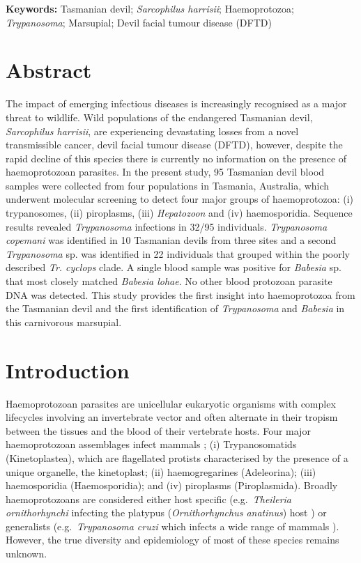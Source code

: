 \documentclass[a4paper, nobind]{templates/ociamthesis}
\begin{document}
\vspace{5mm}

\textbf{Keywords:} Tasmanian devil; \emph{Sarcophilus harrisii}; Haemoprotozoa; \emph{Trypanosoma}; Marsupial; Devil facial tumour disease (DFTD)

\newpage

\hypertarget{abstract-4}{%
\section{Abstract}\label{abstract-4}}

The impact of emerging infectious diseases is increasingly recognised as a major threat to wildlife. Wild populations of the endangered Tasmanian devil, \emph{Sarcophilus harrisii}, are experiencing devastating losses from a novel transmissible cancer, devil facial tumour disease (DFTD), however, despite the rapid decline of this species there is currently no information on the presence of haemoprotozoan parasites. In the present study, 95 Tasmanian devil blood samples were collected from four populations in Tasmania, Australia, which underwent molecular screening to detect four major groups of haemoprotozoa: (i) trypanosomes, (ii) piroplasms, (iii) \emph{Hepatozoon} and (iv) haemosporidia. Sequence results revealed \emph{Trypanosoma} infections in 32/95 individuals. \emph{Trypanosoma copemani} was identified in 10 Tasmanian devils from three sites and a second \emph{Trypanosoma} sp. was identified in 22 individuals that grouped within the poorly described \emph{Tr. cyclops} clade. A single blood sample was positive for \emph{Babesia} sp. that most closely matched \emph{Babesia lohae}. No other blood protozoan parasite DNA was detected. This study provides the first insight into haemoprotozoa from the Tasmanian devil and the first identification of \emph{Trypanosoma} and \emph{Babesia} in this carnivorous marsupial.

\hypertarget{introduction-4}{%
\section{Introduction}\label{introduction-4}}

Haemoprotozoan parasites are unicellular eukaryotic organisms with complex lifecycles involving an invertebrate vector and often alternate in their tropism between the tissues and the blood of their vertebrate hosts. Four major haemoprotozoan assemblages infect mammals \autocite{odonoghueHaemoprotozoaMakingBiological2017}; (i) Trypanosomatids (Kinetoplastea), which are flagellated protists characterised by the presence of a unique organelle, the kinetoplast; (ii) haemogregarines (Adeleorina); (iii) haemosporidia (Haemosporidia); and (iv) piroplasms (Piroplasmida). Broadly haemoprotozoans are considered either host specific (e.g.~\emph{Theileria ornithorhynchi} infecting the platypus (\emph{Ornithorhynchus anatinus}) host \autocite{papariniFirstMolecularCharacterization2015}) or generalists (e.g.~\emph{Trypanosoma cruzi} which infects a wide range of mammals \autocite{clementOutAfricaOrigins2020}). However, the true diversity and epidemiology of most of these species remains unknown.
\end{document}
